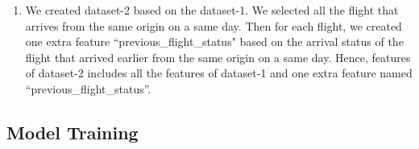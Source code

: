 \begin{enumerate}
	\item We created dataset-2 based on the dataset-1. We selected all the flight that arrives from the same origin on a same day. Then for each flight, we created one extra feature ``previous\_flight\_status" based on the arrival status of the flight that arrived earlier from the same origin on a same day. Hence, features of dataset-2 includes all the features of dataset-1 and one extra feature named ``previous\_flight\_status''.
\end{enumerate}


\subsection{Model Training}
\label{subsec:model_training}

